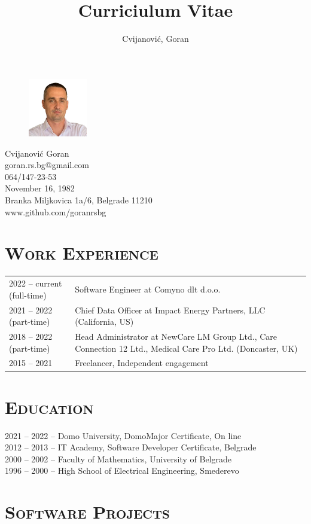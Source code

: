 \documentclass{article}
\begin{document}
\author{ Cvijanović, Goran}
\title{Curriciulum Vitae}

\begin{figure}
\includegraphics[width=73pt]{photo.png}
\end{figure}

Cvijanović Goran \\
goran.rs.bg@gmail.com \\
064/147-23-53 \\
November 16, 1982 \\
Branka Miljkovica 1a/6, Belgrade 11210 \\
www.github.com/goranrsbg

\section{\textsc{Work Experience}}

\begin{tabular}{l | l} 
2022 -- current (full-time) & Software Engineer at Comyno dlt d.o.o.\\
2021 -- 2022 (part-time)  & Chief Data Officer at Impact Energy Partners, LLC (California, US)\\
2018 -- 2022 (part-time)  & Head Administrator at NewCare LM Group Ltd., Care Connection 12 Ltd., Medical Care Pro Ltd. (Doncaster, UK)\\
2015 -- 2021                    & Freelancer, Independent engagement
\end{tabular}

\section{\textsc{Education}}

2021 -- 2022 -- Domo University, DomoMajor Certificate, On line \\
2012 -- 2013 -- IT Academy, Software Developer Certificate, Belgrade \\
2000 -- 2002 -- Faculty of Mathematics, University of Belgrade \\
1996 -- 2000 -- High School of Electrical Engineering, Smederevo

\section{\textsc{Software Projects}}
\end{document}
